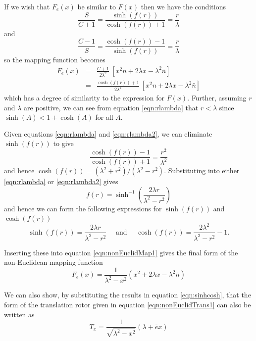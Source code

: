 If we wish that $F_e(x)$ be similar to $F(x)$ then we have the conditions
\begin{equation}
\frac{S}{C + 1} = \frac{\sinh(f(r))}{\cosh(f(r)) + 1} = \frac{r}{\lambda}
\label{eqn:rlambda}
\end{equation}
and
\begin{equation}
\frac{C-1}{S} = \frac{\cosh(f(r)) - 1}{\sinh(f(r))} = \frac{r}{\lambda}
\label{eqn:rlambda2}
\end{equation}
so the mapping function becomes
\begin{eqnarray}
F_e(x) &=& \frac{C+1}{2\lambda^2}\ [x^2n + 2\lambda x - \lambda^2 \bar{n}] \\
&=& \frac{\cosh(f(r)) + 1}{2\lambda^2}\ [x^2n + 2\lambda x - \lambda^2 \bar{n}]
\end{eqnarray}
which has a degree of similarity to the expression for $F(x)$. Further, 
assuming $r$ and $\lambda$ are positive, we can see from equation
\ref{eqn:rlambda} that $r < \lambda$ since $\sinh(A) < 1 + \cosh(A)$
for all $A$.

Given equations \ref{eqn:rlambda} and \ref{eqn:rlambda2}, we can eliminate
$\sinh(f(r))$ to give
\begin{equation}
\frac{\cosh(f(r)) -1}{\cosh(f(r)) + 1} = \frac{r^2}{\lambda^2}
\end{equation}
and hence $\cosh(f(r)) = (\lambda^2 + r^2)/(\lambda^2 - r^2)$. Substituting
into either \ref{eqn:rlambda} or \ref{eqn:rlambda2} gives
\begin{equation}
f(r) = \sinh^{-1}\left( \frac{2\lambda r}{\lambda^2 - r^2} \right)
\end{equation}
and hence we can form the following expressions for 
$\sinh(f(r))$ and $\cosh(f(r))$
\begin{equation}
\sinh(f(r)) = \frac{2\lambda r}{\lambda^2 - r^2} \quad \mbox{ and } \quad
\cosh(f(r)) = \frac{2\lambda^2}{\lambda^2 - r^2} - 1.
\label{eqn:sinhcosh}
\end{equation}

Inserting these into equation \ref{eqn:nonEuclidMap1} gives the final form
of the non-Euclidean mapping function
\begin{equation}
F_e(x) = \frac{1}{\lambda^2 - x^2}(x^2 + 2\lambda x - \lambda^2\bar{n})
\label{eqn:nonEuclidMapping}
\end{equation}

We can also show, by substituting the results in equation \ref{eqn:sinhcosh}, 
that the form of the translation rotor given in 
equation \ref{eqn:nonEuclidTrans1} can also be written as
\begin{equation}
T_x = \frac{1}{\sqrt{\lambda^2 - x^2}}(\lambda + \bar{e}x)
\label{eqn:transrotor}
\end{equation}

